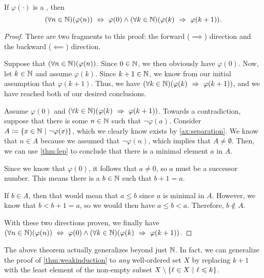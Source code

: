 \begin{theorem}\label{thm:weakinduction}
    If $\varphi(\cdot)$ is a {\wff}, then
    \[
        \pn*{\forall n \in \N}\pn*{\varphi(n)}
        \iff \varphi(0) \meet \pn*{\forall k \in \N}\pn*{\varphi(k) \implies \varphi(k + 1)}.
    \]
\end{theorem}
\begin{proof}
    There are two fragments to this proof:
    the forward ($\implies$) direction and the backward ($\impliedby$) direction.
    \begin{case}
        Suppose that $\pn*{\forall n \in \N}\pn*{\varphi(n)}$.
        Since $0 \in \mathbb{N}$, we then obviously have $\varphi(0)$.
        Now, let $k \in \mathbb{N}$ and assume $\varphi(k)$.
        Since $k + 1 \in \mathbb{N}$, we know from our initial assumption that $\varphi(k + 1)$.
        Thus, we have $\pn*{\forall k \in \N}\pn*{\varphi(k) \implies \varphi(k + 1)}$,
        and we have reached both of our desired conclusions.
    \end{case}
    \begin{case}
        Assume $\varphi(0)$ and $\pn*{\forall k \in \N}\pn*{\varphi(k) \implies \varphi(k + 1)}$.
        Towards a contradiction,
        suppose that there is some $n \in \mathbb{N}$ such that $\neg \varphi(a)$.
        Consider $A \defn \set*{x \in \N \suchthat \neg \varphi(x)}$,
        which we clearly know exists by \autoref{ax:separation}.
        We know that $n \in A$ because we assumed that $\neg \varphi(n)$,
        which implies that $A \neq \emptyset$.
        Then, we can use \autoref{thm:lep} to conclude that there is a minimal element $a$ in $A$.

        Since we know that $\varphi(0)$, it follows that $a \neq 0$, so $a$ must be a successor number.
        This means there is a $b \in \mathbb{N}$ such that $b + 1 = a$.

        If $b \in A$, then that would mean that $a \leq b$ since $a$ is minimal in $A$.
        However, we know that $b < b + 1 = a$, so we would then have $a \leq b < a$. \contradiction
        Therefore, $b \not \in A$.
    \end{case}
    With these two directions proven, we finally have
    $\pn*{\forall n \in \N}\pn*{\varphi(n)}
    \iff \varphi(0) \meet \pn*{\forall k \in \N}\pn*{\varphi(k) \implies \varphi(k + 1)}$.
\end{proof}

\begin{note}
The above theorem actually generalizes beyond just $\mathbb{N}$.
In fact, we can generalize the proof of \autoref{thm:weakinduction}
to \emph{any} well-ordered set $X$ by replacing $k + 1$
with the least element of the non-empty subset $X \setminus \set*{\ell \in X \suchthat \ell \leq k}$.
\end{note}

